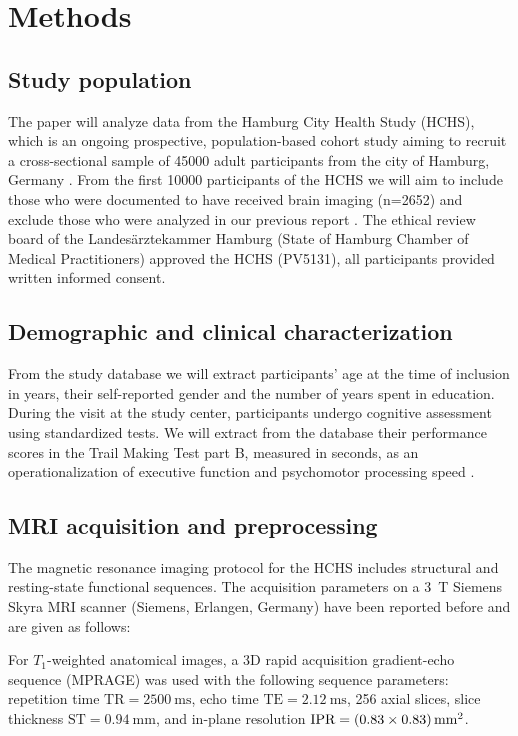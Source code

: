 \section{Methods} \label{methods}

\subsection{Study population}
The paper will analyze data from the Hamburg City Health Study (HCHS), which is an ongoing prospective, population-based cohort study aiming to recruit a cross-sectional sample of \num{45000} adult participants from the city of Hamburg, Germany \citep{Jagodzinski2020-lx}.
From the first \num{10000} participants of the HCHS we will aim to include those who were documented to have received brain imaging (n=2652) and exclude those who were analyzed in our previous report \citep{Schlemm2022-he}.
The ethical review board of the Landesärztekammer Hamburg (State of Hamburg Chamber of Medical Practitioners) approved the HCHS (PV5131), all participants provided written informed consent.

\subsection{Demographic and clinical characterization}
From the study database we will extract participants’ age at the time of inclusion in years, their self-reported gender and the number of years spent in education.
During the visit at the study center, participants undergo cognitive assessment using standardized tests.
We will extract from the database their performance scores in the Trail Making Test part B, measured in seconds, as an operationalization of executive function and psychomotor processing speed \citep{Tombaugh2004-dp,arbuthnott2000trail}.

\subsection{MRI acquisition and preprocessing}
The magnetic resonance imaging protocol for the HCHS includes structural and resting-state functional sequences.
The acquisition parameters on a \qty{3}{\tesla} Siemens Skyra MRI scanner (Siemens, Erlangen, Germany) have been reported before \citep{Petersen2020-cx,Frey2021-sv} and are given as follows:

For $T_1$-weighted anatomical images, a 3D rapid acquisition gradient-echo sequence (MPRAGE) was used with the following sequence parameters: repetition time $\text{TR} = \qty{2500}{\ms}$, echo time $\text{TE} = \qty{2.12}{\ms}$, 256 axial slices, slice thickness $\text{ST} = \qty{0.94}{\mm}$, and in-plane resolution  $\text{IPR} = \qtyproduct[product-units = bracket-power]{0.83 x 0.83}{\mm}$.

